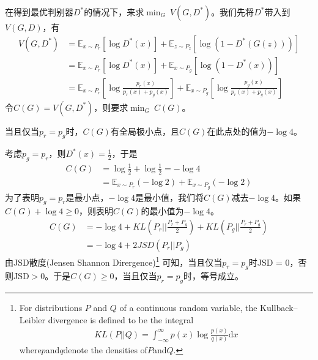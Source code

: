             \par
            在得到最优判别器$D^*$的情况下，来求$\min_G\ V(G,D^*)$。我们先将$D^*$带入到$V(G,D)$，有
            \begin{align*}
            V(G,D^*) &= \mathbb{E}_{x\sim P_r}[\log D^*(x)] + \mathbb{E}_{z\sim P_z}[\log (1-D^*(G(z)))]\\
            &=\mathbb{E}_{x\sim P_r}[\log D^*(x)]+\mathbb{E}_{x\sim P_g}[\log (1-D^*(x))]\\
            &=\mathbb{E}_{x\sim P_r} \left[ \log \frac{p_r(x)}{p_r(x)+p_g(x)} \right] + \mathbb{E}_{x\sim P_g} \left[\log \frac{p_g(x)}{p_r(x)+p_g(x)}   \right]
            \end{align*}
            令$C(G) = V(G,D^*)$，则要求$\min_G\ C(G)$。
            \begin{theorem}
            当且仅当$p_r = p_g$时，$C(G)$有全局极小点，且$C(G)$在此点处的值为$-\log 4$。
            \end{theorem}
            \begin{Proof}
            考虑$p_g = p_r$，则$D^*(x) = \frac{1}{2}$，于是
            \begin{align*}
            C(G) & = \log \frac{1}{2}+\log \frac{1}{2} = -\log 4\\
            & = \mathbb{E}_{x\sim P_r}(-\log 2)+\mathbb{E}_{x\sim P_g}(-\log 2)
            \end{align*}
            为了表明$p_g = p_r$是最小点，$-\log 4$是最小值，我们将$C(G)$减去$-\log 4$。如果$C(G)+\log 4 \geqslant 0$，则表明$C(G)$的最小值为$-\log 4$。
            \begin{align*}
            C(G) & = -\log 4 + KL \left( P_r\Big|\Big| \frac{P_r+P_g}{2} \right) + KL \left( P_g\Big|\Big| \frac{P_r+P_g}{2} \right) \\
            & = -\log 4+ 2JSD(P_r||P_g)
            \end{align*}
            由JSD散度(Jensen Shannon Dirergence)\footnote{
                For distributions $P$ and $Q$ of a continuous random variable, the Kullback–Leibler divergence is defined to be the integral
                \begin{align*}
                    KL(P||Q) = \int_{-\infty}^\infty p(x) \log \frac{p(x)}{q(x)}\mathrm{d}x
                \end{align*}
                where$ p $and$ q $denote the densities of$ P $and$ Q$.
             }
            可知，当且仅当$p_r = p_g$时JSD = 0，否则JSD$>0$。于是$C(G) \geqslant 0$，当且仅当$p_r = p_g$时，等号成立。
            \end{Proof}
